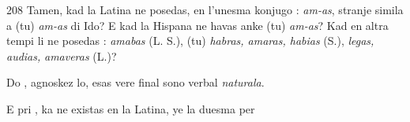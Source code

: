 \begin{VUpage}[212]{208}
Tamen, kad la Latina ne posedas, en l'unesma konjugo :\nl
\textit{am-as}, stranje simila a (tu) \textit{am-as} di Ido? E kad la Hispana\nl
ne havas anke (tu) \textit{am-as}? Kad en altra tempi li ne posedas :\nl
\textit{amabas} (L. S.), (tu) \textit{habras, amaras, habias} (S.), \textit{legas, audias,}\nl
\textit{amaveras} (L.)?

Do , agnoskez lo, esas vere final sono verbal \textit{naturala}.\parplein

E pri , ka ne existas en la Latina, ye la duesma per\cc
\end{VUpage}

